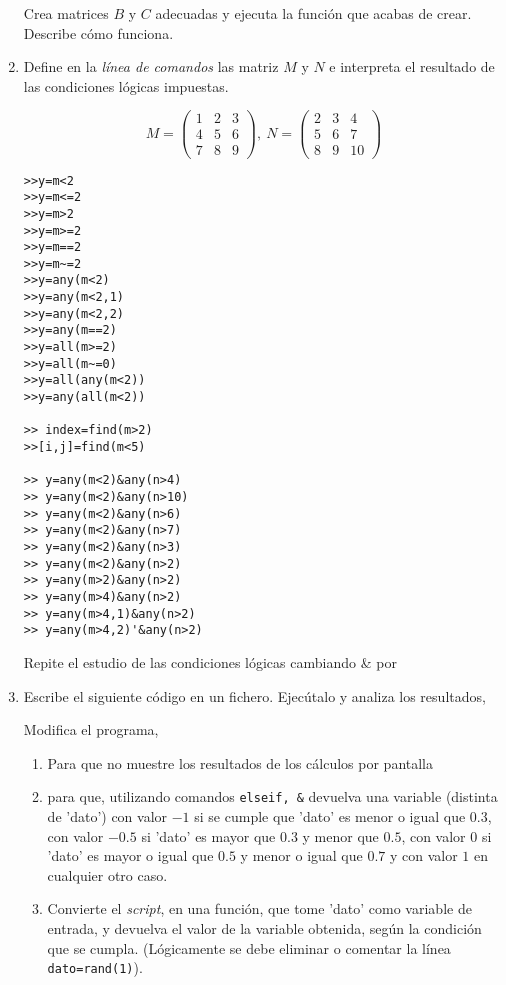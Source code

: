 \begin{enumerate}
Crea matrices $B$ y $C$ adecuadas y ejecuta la función que acabas de crear. Describe cómo funciona.

\item Define en la \emph{línea de comandos} las matriz $M$ y $N$ e interpreta el resultado de las condiciones lógicas impuestas.

\begin{equation*}
M =\begin{pmatrix}
1&2&3\\
4&5&6\\
7&8&9
\end{pmatrix}, \ N=\begin{pmatrix}
2&3&4\\
5&6&7\\
8&9&10
\end{pmatrix}
\end{equation*}
\begin{verbatim}
>>y=m<2
>>y=m<=2
>>y=m>2
>>y=m>=2
>>y=m==2
>>y=m~=2
>>y=any(m<2)
>>y=any(m<2,1)
>>y=any(m<2,2)
>>y=any(m==2)
>>y=all(m>=2)
>>y=all(m~=0)
>>y=all(any(m<2))
>>y=any(all(m<2))

>> index=find(m>2)
>>[i,j]=find(m<5)

>> y=any(m<2)&any(n>4)
>> y=any(m<2)&any(n>10)
>> y=any(m<2)&any(n>6)
>> y=any(m<2)&any(n>7)
>> y=any(m<2)&any(n>3)
>> y=any(m<2)&any(n>2)
>> y=any(m>2)&any(n>2)
>> y=any(m>4)&any(n>2)
>> y=any(m>4,1)&any(n>2)
>> y=any(m>4,2)'&any(n>2)
\end{verbatim}
Repite el estudio de las condiciones lógicas cambiando \& por \textbar

\item Escribe el siguiente código en un fichero. Ejecútalo y analiza los resultados,

Modifica el programa,
\begin{enumerate}
\item Para que no muestre los resultados de los cálculos por pantalla
\item para que, utilizando comandos \verb|elseif, &| devuelva una variable (distinta de 'dato') con valor $-1$ si se cumple que 'dato' es menor o igual que $0.3$, con valor $-0.5$ si 'dato' es mayor que $0.3$ y menor que $0.5$, con valor $0$ si 'dato' es mayor o igual que $0.5$ y menor  o igual que $0.7$ y con valor $1$ en cualquier otro caso.
\item Convierte el \emph{script}, en una función, que tome 'dato' como variable de entrada, y devuelva el valor de la variable obtenida, según la condición que se cumpla. (Lógicamente se debe eliminar o comentar la línea \verb|dato=rand(1)|).
\end{enumerate}


\end{enumerate}
